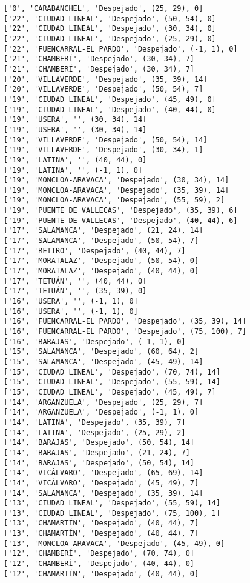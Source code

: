 \documentclass[11pt]{article}
\begin{document}
\begin{Verbatim}[commandchars=\\\{\}]
['0', 'CARABANCHEL', 'Despejado', (25, 29), 0]
['22', 'CIUDAD LINEAL', 'Despejado', (50, 54), 0]
['22', 'CIUDAD LINEAL', 'Despejado', (30, 34), 0]
['22', 'CIUDAD LINEAL', 'Despejado', (25, 29), 0]
['22', 'FUENCARRAL-EL PARDO', 'Despejado', (-1, 1), 0]
['21', 'CHAMBERÍ', 'Despejado', (30, 34), 7]
['21', 'CHAMBERÍ', 'Despejado', (30, 34), 7]
['20', 'VILLAVERDE', 'Despejado', (35, 39), 14]
['20', 'VILLAVERDE', 'Despejado', (50, 54), 7]
['19', 'CIUDAD LINEAL', 'Despejado', (45, 49), 0]
['19', 'CIUDAD LINEAL', 'Despejado', (40, 44), 0]
['19', 'USERA', '', (30, 34), 14]
['19', 'USERA', '', (30, 34), 14]
['19', 'VILLAVERDE', 'Despejado', (50, 54), 14]
['19', 'VILLAVERDE', 'Despejado', (30, 34), 1]
['19', 'LATINA', '', (40, 44), 0]
['19', 'LATINA', '', (-1, 1), 0]
['19', 'MONCLOA-ARAVACA', 'Despejado', (30, 34), 14]
['19', 'MONCLOA-ARAVACA', 'Despejado', (35, 39), 14]
['19', 'MONCLOA-ARAVACA', 'Despejado', (55, 59), 2]
['19', 'PUENTE DE VALLECAS', 'Despejado', (35, 39), 6]
['19', 'PUENTE DE VALLECAS', 'Despejado', (40, 44), 6]
['17', 'SALAMANCA', 'Despejado', (21, 24), 14]
['17', 'SALAMANCA', 'Despejado', (50, 54), 7]
['17', 'RETIRO', 'Despejado', (40, 44), 7]
['17', 'MORATALAZ', 'Despejado', (50, 54), 0]
['17', 'MORATALAZ', 'Despejado', (40, 44), 0]
['17', 'TETUÁN', '', (40, 44), 0]
['17', 'TETUÁN', '', (35, 39), 0]
['16', 'USERA', '', (-1, 1), 0]
['16', 'USERA', '', (-1, 1), 0]
['16', 'FUENCARRAL-EL PARDO', 'Despejado', (35, 39), 14]
['16', 'FUENCARRAL-EL PARDO', 'Despejado', (75, 100), 7]
['16', 'BARAJAS', 'Despejado', (-1, 1), 0]
['15', 'SALAMANCA', 'Despejado', (60, 64), 2]
['15', 'SALAMANCA', 'Despejado', (45, 49), 14]
['15', 'CIUDAD LINEAL', 'Despejado', (70, 74), 14]
['15', 'CIUDAD LINEAL', 'Despejado', (55, 59), 14]
['15', 'CIUDAD LINEAL', 'Despejado', (45, 49), 7]
['14', 'ARGANZUELA', 'Despejado', (25, 29), 7]
['14', 'ARGANZUELA', 'Despejado', (-1, 1), 0]
['14', 'LATINA', 'Despejado', (35, 39), 7]
['14', 'LATINA', 'Despejado', (25, 29), 2]
['14', 'BARAJAS', 'Despejado', (50, 54), 14]
['14', 'BARAJAS', 'Despejado', (21, 24), 7]
['14', 'BARAJAS', 'Despejado', (50, 54), 14]
['14', 'VICÁLVARO', 'Despejado', (65, 69), 14]
['14', 'VICÁLVARO', 'Despejado', (45, 49), 7]
['14', 'SALAMANCA', 'Despejado', (35, 39), 14]
['13', 'CIUDAD LINEAL', 'Despejado', (55, 59), 14]
['13', 'CIUDAD LINEAL', 'Despejado', (75, 100), 1]
['13', 'CHAMARTÍN', 'Despejado', (40, 44), 7]
['13', 'CHAMARTÍN', 'Despejado', (40, 44), 7]
['13', 'MONCLOA-ARAVACA', 'Despejado', (45, 49), 0]
['12', 'CHAMBERÍ', 'Despejado', (70, 74), 0]
['12', 'CHAMBERÍ', 'Despejado', (40, 44), 0]
['12', 'CHAMARTÍN', 'Despejado', (40, 44), 0]

\end{Verbatim}
\end{document}
